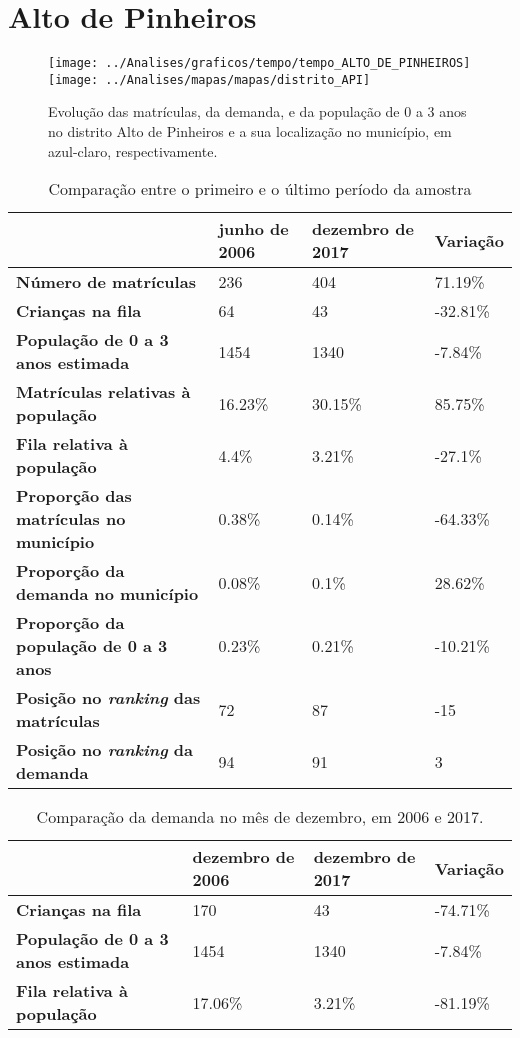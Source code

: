 \section{Alto de Pinheiros}
\begin{figure}[H]
\centering
\texttt{[image: ../Analises/graficos/tempo/tempo\_ALTO\_DE\_PINHEIROS]}
\texttt{[image: ../Analises/mapas/mapas/distrito\_API]}
\caption{Evolução das matrículas, da demanda, e da população de 0 a 3 anos no distrito Alto de Pinheiros e a sua localização no município, em azul-claro, respectivamente.}
\end{figure}
\begin{table}[H]
\begin{tabular}{l|l|l|l}
\textbf{}                                      & \textbf{junho de 2006}       & \textbf{dezembro de 2017}    & \textbf{Variação} \\ \hline
\textbf{Número de matrículas}                  & 236 & 404 & 71.19\% \\ \hline
\textbf{Crianças na fila}                      & 64 & 43 & -32.81\% \\ \hline
\textbf{População de 0 a 3 anos estimada}      & 1454 & 1340 & -7.84\% \\ \hline
\textbf{Matrículas relativas à população}      & 16.23\% & 30.15\% & 85.75\% \\ \hline
\textbf{Fila relativa à população}             & 4.4\% & 3.21\% & -27.1\% \\ \hline
\textbf{Proporção das matrículas no município} & 0.38\% & 0.14\% & -64.33\% \\ \hline
\textbf{Proporção da demanda no município}     & 0.08\% & 0.1\% & 28.62\% \\ \hline
\textbf{Proporção da população de 0 a 3 anos}  & 0.23\% & 0.21\% & -10.21\% \\ \hline
\textbf{Posição no \textit{ranking} das matrículas}     & 72 & 87 & -15 \\ \hline
\textbf{Posição no \textit{ranking} da demanda}         & 94 & 91 & 3 \\ 
\end{tabular}
\caption{Comparação entre o primeiro e o último período da amostra}
\end{table}
\begin{table}[H]
\begin{tabular}{l|l|l|l}
\textbf{}                                 & \textbf{dezembro de 2006} & \textbf{dezembro de 2017} & \textbf{Variação} \\ \hline
\textbf{Crianças na fila}                      & 170 & 43 & -74.71\% \\ \hline
\textbf{População de 0 a 3 anos estimada}      & 1454 & 1340 & -7.84\% \\ \hline
\textbf{Fila relativa à população}             & 17.06\% & 3.21\% & -81.19\% \\
\end{tabular}
\caption{Comparação da demanda no mês de dezembro, em 2006 e 2017.}
\end{table}
